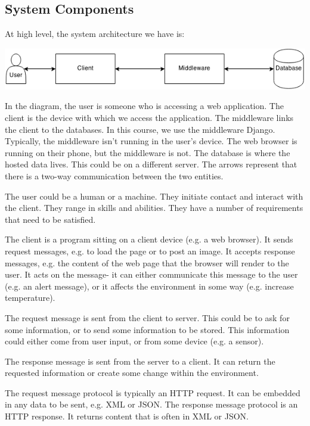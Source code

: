 \documentclass[a4paper, openany]{memoir}
\begin{document}
    \subsection{System Components}
    \noindent At high level, the system architecture we have is:
    \begin{center}
        \includegraphics[scale=0.8]{src/L1I1.png}
    \end{center}
    In the diagram, the user is someone who is accessing a web application. The client is the device with which we access the application. The middleware links the client to the databases. In this course, we use the middleware Django. Typically, the middleware isn't running in the user's device. The web browser is running on their phone, but the middleware is not. The database is where the hosted data lives. This could be on a different server. The arrows represent that there is a two-way communication between the two entities.

    \noindent The user could be a human or a machine. They initiate contact and interact with the client. They range in skills and abilities. They have a number of requirements that need to be satisfied. 

    \noindent The client is a program sitting on a client device (e.g. a web browser). It sends request messages, e.g. to load the page or to post an image. It accepts response messages, e.g. the content of the web page that the browser will render to the user. It acts on the message- it can either communicate this message to the user (e.g. an alert message), or it affects the environment in some way (e.g. increase temperature).

    \noindent The request message is sent from the client to server. This could be to ask for some information, or to send some information to be stored. This information could either come from user input, or from some device (e.g. a sensor).

    \noindent The response message is sent from the server to a client. It can return the requested information or create some change within the environment.

    \noindent The request message protocol is typically an HTTP request. It can be embedded in any data to be sent, e.g. XML or JSON. The response message protocol is an HTTP response. It returns content that is often in XML or JSON.
\end{document}
